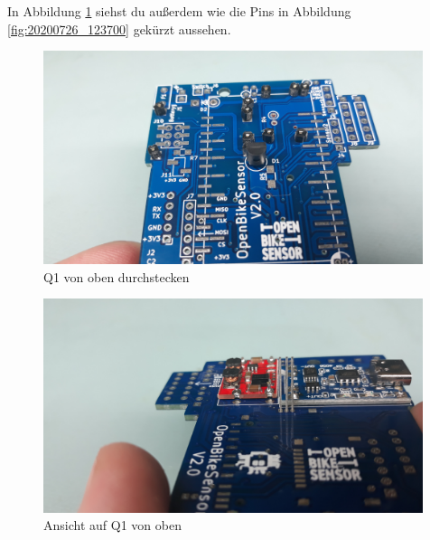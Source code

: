 \documentclass[12pt, a4paper]{article}		%
\begin{document}
In Abbildung \ref{fig:20200726_124649} siehst du außerdem wie die Pins in Abbildung \ref{fig:20200726_123700} gekürzt aussehen.
\begin{minipage}[t]{0.49\textwidth}
\begin{figure}[H]
	\centering
		\includegraphics[width=0.99\textwidth]{Grafiken/20200726_124649.jpg}
	\caption{Q1 von oben durchstecken}
	\label{fig:20200726_124649}
\end{figure}
\end{minipage}
\begin{minipage}[t]{0.49\textwidth}
\begin{figure}[H]
	\centering
		\includegraphics[width=0.99\textwidth]{Grafiken/20200726_124658.jpg}
	\caption{Ansicht auf Q1 von oben}
	\label{fig:}
\end{figure}
\end{minipage}
\end{document}
